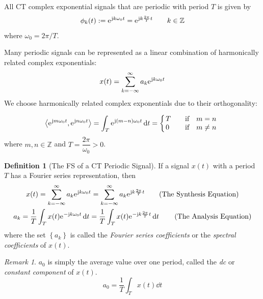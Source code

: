 \documentclass[10pt,UTF8]{article}
\makeatletter
\newenvironment{definition box}
{\begin{tcolorbox}[colback=blue!5!white,colframe=blue!75!black,parbox=false,before upper=\par,before lower=\par]}
{\end{tcolorbox}}
\newenvironment{theorem box}
{\begin{tcolorbox}[colback=yellow!5!white,colframe=yellow!75!black,parbox=false,before upper=\par,before lower=\par]}
{\end{tcolorbox}}
\theoremstyle{definition}
\newtheorem{definition inner}{Definition}[section]
\newenvironment{definition}[1][]
{\begin{definition box}\begin{definition inner}[#1]\hfill\par}
{\end{definition inner}\end{definition box}}
\theoremstyle{plain}
\newtheorem{theorem inner}{Theorem}[section]
\theoremstyle{definition}
\newtheorem*{proof inner}{\textit{Proof}}
\theoremstyle{remark}
\newtheorem*{remark}{\textit{Remark}}
\newcommand{\mycases}[2][0.8]{
    \left\{\vphantom{\scalebox{#1}{
        $\begin{matrix}#2\end{matrix}$
    }}\right.\!\!\!\!
    \begin{array}{l@{\quad}l}#2\end{array}
}
\newcommand{\ju}{\mathrm{j}}  %
\newcommand{\e}{\mathrm{e}{\mkern 1 mu}}
\makeatother
\begin{document}
All CT complex exponential
signals that are periodic with period $T$ is given by
\begin{equation*}
    \phi_k(t) := \e^{\ju k \omega_0 t} = \e^{\ju k \frac{2\pi}{T} t}
    \qquad k \in \mathbb{Z}
\end{equation*}
where $\omega_0 = 2\pi/T$.

Many periodic signals can be represented as a linear combination of harmonically
related complex exponentials:
\begin{equation*}
    x(t) = \sum_{k=-\infty}^{\infty} a_k \e^{\ju k \omega_0 t}
\end{equation*}
We choose harmonically related complex exponentials due to their orthogonality:
\begin{theorem box}
    \begin{equation*}
    \left< \e^{\ju m \omega_0 t}, \e^{\ju n \omega_0 t} \right> =
    \int_T \e^{\ju(m-n) \omega_0 t}\dd{t} =
    \mycases{
        T & \qif m=n \\
        0 & \qif m\neq n
        }
    \end{equation*}
    where $m,n\in\mathbb{Z}$ and $T=\dfrac{2\pi}{\omega_0}>0$.
\end{theorem box}

\begin{definition}[The FS of a CT Periodic Signal]
    If a signal $x(t)$ with a period $T$ has a Fourier series representation,
    then
    \begin{gather*}
        x(t) = \sum_{k=-\infty}^{\infty} a_k \e^{\ju k \omega_0 t}
        = \sum_{k=-\infty}^{\infty} a_k \e^{\ju k\frac{2\pi}{T}t}
        \tag{The Synthesis Equation} \\
        a_k = \frac{1}{T} \int_T x(t) \e^{-\ju k\omega_0 t} \dd{t}
        = \frac{1}{T} \int_T x(t) \e^{-\ju k\frac{2\pi}{T}t} \dd{t}
        \tag{The Analysis Equation}
    \end{gather*}
    where the set $\left\{a_k\right\}$ is called
    the \emph{Fourier series coefficients} or
    the \emph{spectral coefficients} of $x(t)$.
\end{definition}

\begin{remark}
    $a_0$ is simply the average value over one period,
    called the \emph{dc} or \emph{constant component} of $x(t)$.
    \begin{equation*}
        a_0 = \frac{1}{T}\int_T x(t) \dd{t}
    \end{equation*}
\end{remark}
\end{document}
